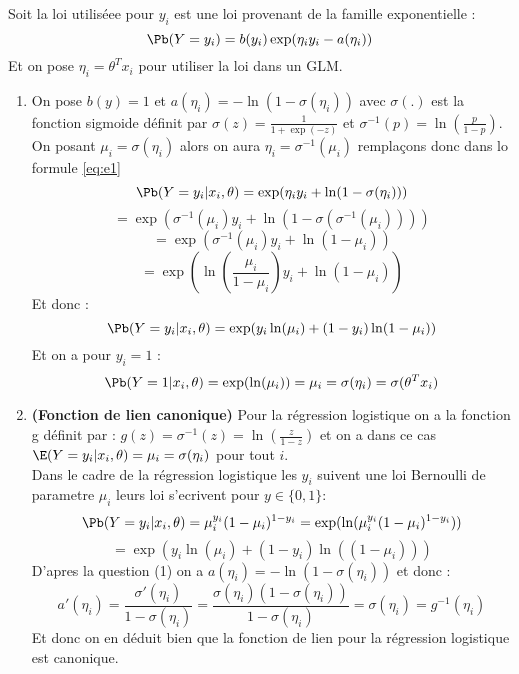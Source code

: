 \documentclass[12pt]{article}
\begin{document}
Soit la loi utiliséee pour $y_i$ est une loi provenant de la famille exponentielle :
\begin{equation}
    \Pb(Y=y_i) = b(y_i) \exp(\eta_iy_i-a(\eta_i))
    \label{eq:e1}
\end{equation}
Et on pose $\eta_i = \theta^Tx_i$ pour utiliser la loi dans un GLM.
\begin{enumerate}[1)]
    \item On pose $b(y) = 1$  et $a(\eta_i) = - \ln(1-\sigma(\eta_i))$ avec $\sigma(.)$ est la fonction sigmoide définit par $\sigma(z) = \frac{1}{1+\exp(-z)}$ et $\sigma^{-1}(p)=\ln(\frac{p}{1-p})$.   
     \\
     On posant $\mu_i = \sigma(\eta_i)$ alors on aura $\eta_i = \sigma^{-1}(\mu_i)$ remplaçons donc dans lo formule \eqref{eq:e1}
     $$
      \Pb(Y=y_i \lvert x_i,\theta ) = \exp(\eta_iy_i+\ln(1-\sigma(\eta_i)))
     $$
     $$
      = \exp(\sigma^{-1}(\mu_i)y_i+\ln(1-\sigma(\sigma^{-1}(\mu_i))))
     $$
     $$
      = \exp(\sigma^{-1}(\mu_i)y_i+\ln(1-\mu_i))
     $$
     $$
      = \exp(\ln(\frac{\mu_i}{1-\mu_i})y_i+\ln(1-\mu_i))
     $$
     Et donc :
     $$
     \Pb(Y=y_i \lvert x_i,\theta ) = \exp(y_i\ln(\mu_i) +(1-y_i)\ln(1-\mu_i))
     $$
     Et on a pour $y_i=1$ : 
     $$
     \Pb(Y=1 \lvert x_i,\theta ) = \exp(\ln(\mu_i)) = \mu_i = \sigma(\eta_i)=\sigma(\theta^Tx_i)
     $$
     \item \textbf{(Fonction de lien canonique)} Pour la régression logistique on a la fonction g définit par : $g(z) = \sigma^{-1}(z) = \ln(\frac{z}{1-z})$ et on a dans ce cas $\E(Y=y_i\lvert x_i,\theta) = \mu_i = \sigma(\eta_i)$ pour tout $i$.\\
     Dans le cadre de la régression logistique les $y_i$ suivent une loi Bernoulli de parametre $\mu_i$ leurs loi s'ecrivent pour $y\in \{0,1\}$: 
     $$
     \Pb(Y = y_i \lvert x_i,\theta ) =\mu_i^{y_i}(1-\mu_i)^{1-y_i} = \exp(\ln(\mu_i^{y_i}(1-\mu_i)^{1-y_i}))
     $$
     $$
     =\exp(y_i\ln(\mu_i)+(1-y_i)\ln((1-\mu_i)))
     $$
     D'apres la question (1) on a $a(\eta_i) = - \ln(1-\sigma(\eta_i))$ et donc : 
     $$
     a'(\eta_i)=\frac{\sigma'(\eta_i)}{1-\sigma(\eta_i)} = \frac{\sigma(\eta_i)(1-\sigma(\eta_i))}{1-\sigma(\eta_i)} = \sigma(\eta_i) = g^{-1}(\eta_i)
     $$
     Et donc on en déduit bien que la fonction de lien pour la régression logistique est canonique.
     
\end{enumerate}

 
\end{document}
